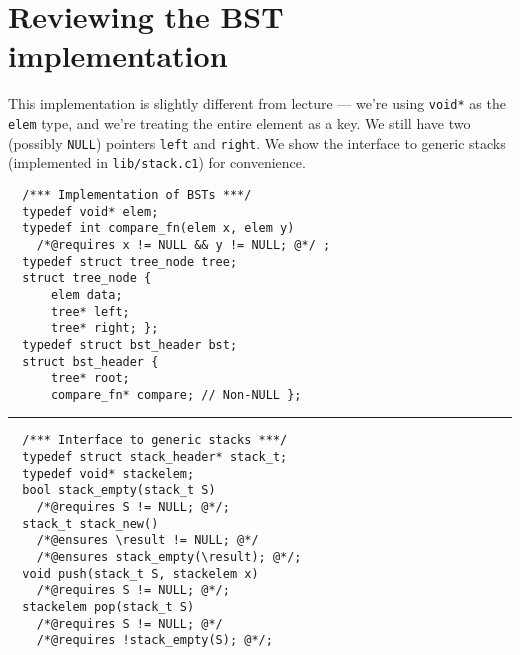 \section*{Reviewing the BST implementation}

This implementation is
slightly different from lecture --- we're using
\lstinline'void*' as the \lstinline'elem' type, and we're treating the
entire element as a key. We still have two (possibly \lstinline'NULL')
pointers \lstinline'left' and \lstinline'right'. We show
the interface to generic stacks (implemented in \lstinline'lib/stack.c1') for convenience.

\bgroup
\smalllistings
\vspace{-2ex}
\begin{minipage}[t]{0.54\linewidth}
\begin{lstlisting}
  /*** Implementation of BSTs ***/
  typedef void* elem;
  typedef int compare_fn(elem x, elem y)
    /*@requires x != NULL && y != NULL; @*/ ;
  typedef struct tree_node tree;
  struct tree_node {
      elem data;
      tree* left;
      tree* right; };
  typedef struct bst_header bst;
  struct bst_header {
      tree* root;
      compare_fn* compare; // Non-NULL };
\end{lstlisting}
\end{minipage}
\rule[-34ex]{0.01em}{32ex}
\begin{minipage}[t]{0.44\linewidth}
\begin{lstlisting}
  /*** Interface to generic stacks ***/
  typedef struct stack_header* stack_t;
  typedef void* stackelem;
  bool stack_empty(stack_t S)
    /*@requires S != NULL; @*/;
  stack_t stack_new()
    /*@ensures \result != NULL; @*/
    /*@ensures stack_empty(\result); @*/;
  void push(stack_t S, stackelem x)
    /*@requires S != NULL; @*/;
  stackelem pop(stack_t S)
    /*@requires S != NULL; @*/
    /*@requires !stack_empty(S); @*/;
\end{lstlisting}
\end{minipage}
\vspace{-2ex}
\egroup

\addtocounter{TheQuestionNumber}{-1}
